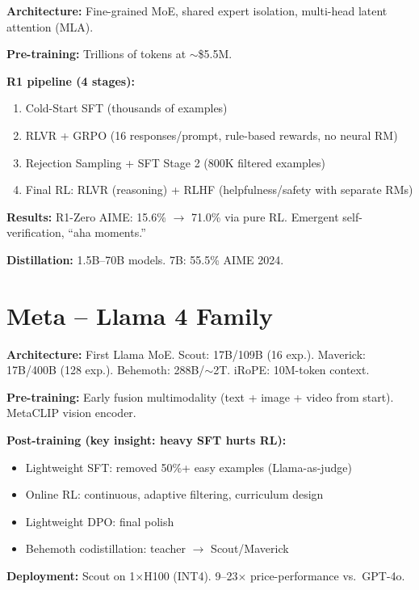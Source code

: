 \begin{companybox}[DeepSeek -- R1 / V3]
\textbf{Architecture:} Fine-grained MoE, shared expert isolation, multi-head latent attention (MLA).

\textbf{Pre-training:} Trillions of tokens at $\sim$\$5.5M.

\textbf{R1 pipeline \parencite{guo2025deepseekr1} (4 stages):}
\begin{enumerate}[leftmargin=*]
  \item Cold-Start SFT (thousands of examples)
  \item RLVR + GRPO (16 responses/prompt, rule-based rewards, no neural RM)
  \item Rejection Sampling + SFT Stage 2 (800K filtered examples)
  \item Final RL: RLVR (reasoning) + RLHF (helpfulness/safety with separate RMs)
\end{enumerate}

\textbf{Results:} R1-Zero AIME: 15.6\% $\rightarrow$ 71.0\% via pure RL. Emergent self-verification, ``aha moments.''

\textbf{Distillation:} 1.5B--70B models. 7B: 55.5\% AIME 2024.
\end{companybox}

\section{Meta -- Llama 4 Family}

\begin{companybox}
\textbf{Architecture:} First Llama MoE. Scout: 17B/109B (16 exp.). Maverick: 17B/400B (128 exp.). Behemoth: 288B/$\sim$2T. iRoPE: 10M-token context.

\textbf{Pre-training:} Early fusion multimodality (text + image + video from start). MetaCLIP vision encoder.

\textbf{Post-training (key insight: heavy SFT hurts RL):}
\begin{itemize}[leftmargin=*]
  \item Lightweight SFT: removed 50\%+ easy examples (Llama-as-judge)
  \item Online RL: continuous, adaptive filtering, curriculum design
  \item Lightweight DPO: final polish
  \item Behemoth codistillation: teacher $\rightarrow$ Scout/Maverick
\end{itemize}

\textbf{Deployment:} Scout on 1$\times$H100 (INT4). 9--23$\times$ price-performance vs.\ GPT-4o.
\end{companybox}

